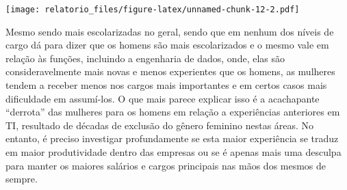 \documentclass[
]{article}
\begin{document}
\texttt{[image: relatorio\_files/figure-latex/unnamed-chunk-12-2.pdf]}

Mesmo sendo mais escolarizadas no geral, sendo que em nenhum dos níveis
de cargo dá para dizer que os homens são mais escolarizados e o mesmo
vale em relação às funções, incluindo a engenharia de dados, onde, elas
são consideravelmente mais novas e menos experientes que os homens, as
mulheres tendem a receber menos nos cargos mais importantes e em certos
casos mais dificuldade em assumí-los. O que mais parece explicar isso é
a acachapante ``derrota'' das mulheres para os homens em relação a
experiências anteriores em TI, resultado de décadas de exclusão do
gênero feminino nestas áreas. No entanto, é preciso investigar
profundamente se esta maior experiência se traduz em maior produtividade
dentro das empresas ou se é apenas mais uma desculpa para manter os
maiores salários e cargos principais nas mãos dos mesmos de sempre.
\end{document}
